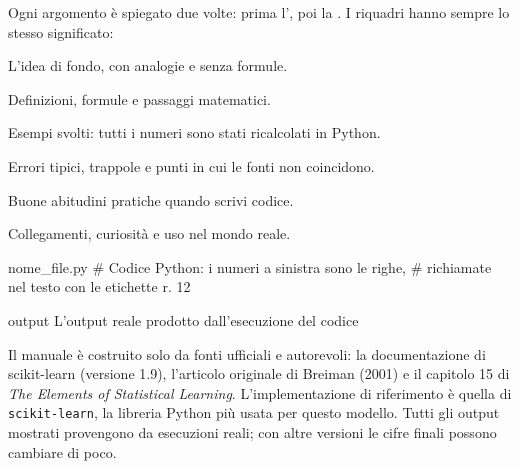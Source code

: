 Ogni argomento è spiegato due volte: prima l', poi la . I riquadri hanno sempre lo stesso significato:
\begin{intuizione}L'idea di fondo, con analogie e senza formule.\end{intuizione}
\begin{tecnica}Definizioni, formule e passaggi matematici.\end{tecnica}
\begin{esempio}Esempi svolti: tutti i numeri sono stati ricalcolati in Python.\end{esempio}
\begin{attenzione}Errori tipici, trappole e punti in cui le fonti non coincidono.\end{attenzione}
\begin{consiglio}Buone abitudini pratiche quando scrivi codice.\end{consiglio}
\begin{mlbox}Collegamenti, curiosità e uso nel mondo reale.\end{mlbox}
\begin{codice}{nome_file.py}
# Codice Python: i numeri a sinistra sono le righe,
# richiamate nel testo con le etichette  r. 12
\end{codice}
\begin{terminale}{output}
L'output reale prodotto dall'esecuzione del codice
\end{terminale}


\clearpage\thispagestyle{plain}
\tableofcontents
\vspace{10pt}
\begin{mlbox}
Il manuale è costruito solo da fonti ufficiali e autorevoli: la documentazione di scikit-learn (versione 1.9), l'articolo originale di Breiman (2001) e il capitolo 15 di \emph{The Elements of Statistical Learning}. L'implementazione di riferimento è quella di \texttt{scikit-learn}, la libreria Python più usata per questo modello. Tutti gli output mostrati provengono da esecuzioni reali; con altre versioni le cifre finali possono cambiare di poco.
\end{mlbox}
















